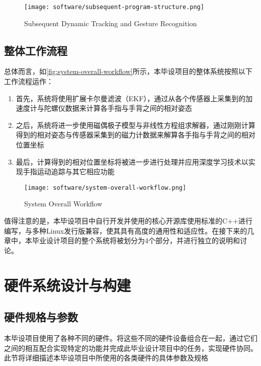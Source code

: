 \begin{figure}[H]
    \centering
    \texttt{[image: software/subsequent-program-structure.png]}
    \caption{\label{fig:subsequent-program-structure}Subsequent Dynamic Tracking and Gesture Recognition}
\end{figure}

\subsection{整体工作流程}
总体而言，如\autoref{fig:system-overall-workflow}所示，本毕设项目的整体系统按照以下工作流程运作：
\begin{enumerate}
    \item 首先，系统将使用扩展卡尔曼滤波（EKF），通过从各个传感器上采集到的加速度计与陀螺仪数据来计算各手指与手背之间的相对姿态
    \item 之后，系统将进一步使用磁偶极子模型与非线性方程组求解器，通过刚刚计算得到的相对姿态与传感器采集到的磁力计数据来解算各手指与手背之间的相对位置坐标
    \item 最后，计算得到的相对位置坐标将被进一步进行处理并应用深度学习技术以实现手指运动追踪与其它相应功能
\end{enumerate}

\begin{figure}[H]
    \centering
    \texttt{[image: software/system-overall-workflow.png]}
    \caption{\label{fig:system-overall-workflow}System Overall Workflow}
\end{figure}

值得注意的是，本毕设项目中自行开发并使用的核心开源库使用标准的C++进行编写，与多种Linux发行版兼容，使其具有高度的通用性和适应性。在接下来的几章中，本毕业设计项目的整个系统将被划分为4个部分，并进行独立的说明和讨论。

\cleardoublepage
\section{硬件系统设计与构建}
\subsection{硬件规格与参数}
本毕设项目使用了各种不同的硬件。将这些不同的硬件设备组合在一起，通过它们之间的相互配合实现特定的功能并完成此毕业设计项目中的任务，实现硬件协同。
此节将详细描述本毕设项目中所使用的各类硬件的具体参数及规格
